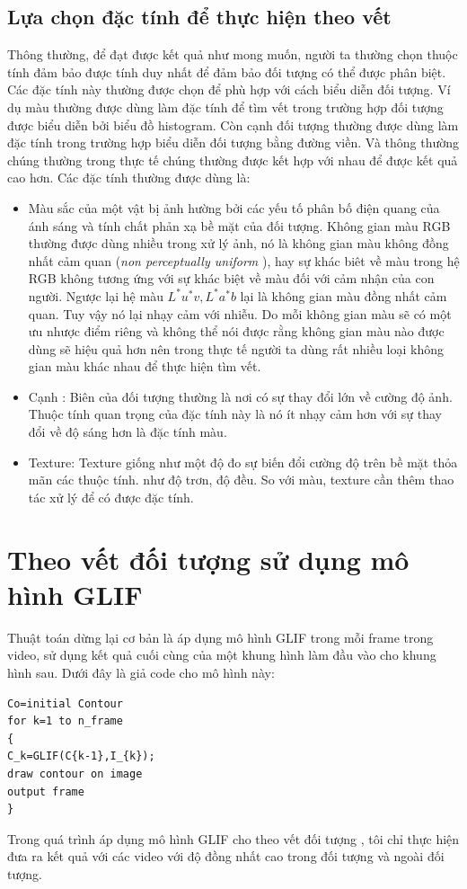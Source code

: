 \documentclass[12pt, oneside, a4paper]{book}
\begin{document}
\subsection{Lựa chọn đặc tính để thực hiện theo vết}
Thông thường, để đạt được kết quả như mong muốn, người ta thường chọn thuộc tính đảm bảo được tính duy nhất để đảm bảo đối tượng có thể được phân biệt. Các đặc tính này thường được chọn để phù hợp với cách biểu diễn đối tượng. Ví dụ màu thường được dùng làm đặc tính để tìm vết trong trường hợp đối tượng được biểu diễn bởi biểu đồ histogram. Còn cạnh đối tượng thường được dùng làm đặc tính trong trường hợp biểu diễn đối tượng bằng đường viền. Và thông thường chúng thường trong thực tế chúng thường được kết hợp với nhau để được kết quả cao hơn. Các đặc tính thường được dùng là:
\begin{itemize}

\item Màu sắc của một vật bị ảnh hường bởi các yếu tố  phân bố điện quang của ánh sáng và tính chất phản xạ bề mặt của đối tượng. Không gian màu RGB thường được dùng nhiều trong xử lý ảnh, nó là không gian màu không đồng nhất cảm quan (\textit{non perceptually uniform} ), hay sự khác biêt về màu trong hệ RGB không tương ứng với sự khác biệt về màu đối với cảm nhận của con người. Ngược lại hệ màu $L^*u^*v, L^*a^*b$ lại là không gian màu đồng nhất cảm quan. Tuy vậy nó lại nhạy cảm với nhiễu. Do  mỗi không gian màu sẽ có một ưu nhược điểm riêng và không thể nói được rằng không gian màu nào được dùng sẽ hiệu quả hơn nên trong thực tế người ta dùng rất nhiều loại không gian màu khác nhau để thực hiện tìm vết.
\item Cạnh : Biên của đối tượng thường là nơi có sự thay đổi lớn về cường độ ảnh. Thuộc tính quan trọng của đặc tính này là nó ít nhạy cảm hơn với sự thay đổi về độ sáng hơn là đặc tính màu. 
\item Texture: Texture giống như một độ đo sự biến đổi cường độ trên bề mặt thỏa mãn các thuộc tính. như độ trơn, độ đều. So với màu, texture cần thêm thao tác xử lý để có được đặc tính. 

\end{itemize}
\section{Theo vết đối tượng sử dụng mô hình GLIF}
Thuật toán dừng lại cơ bản là áp dụng mô hình GLIF trong mỗi frame trong video, sử dụng kết quả cuối cùng của một khung hình làm đầu vào cho khung hình sau. Dưới đây là giả code cho mô hình này:
\begin{lstlisting}
Co=initial Contour
for k=1 to n_frame 
{
C_k=GLIF(C{k-1},I_{k});
draw contour on image
output frame
}

\end{lstlisting}
Trong quá trình áp dụng mô hình GLIF cho theo vết đối tượng  , tôi chỉ thực hiện đưa ra kết quả với các video với độ đồng nhất cao trong đối tượng và ngoài đối tượng.  
\end{document}
